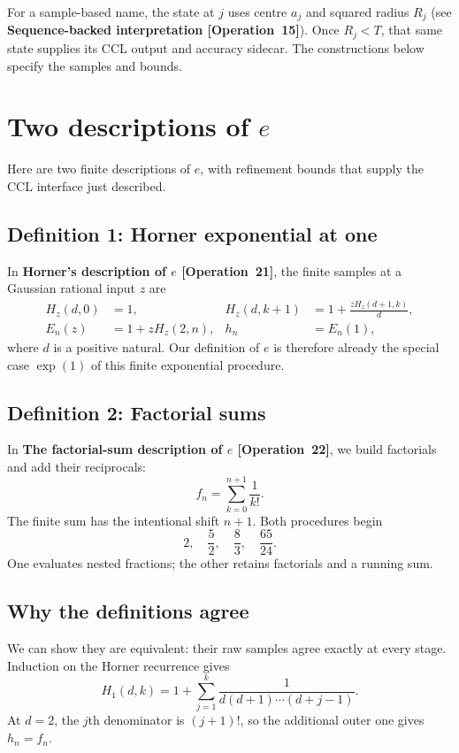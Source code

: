 \documentclass[11pt]{article}
\newcommand{\entryname}[3]{\textbf{#3 \mbox{[#1~#2]}}}
\begin{document}
For a sample-based name, the state at $j$ uses centre $a_j$ and squared
radius $R_j$ (see \entryname{Operation}{15}{Sequence-backed interpretation}).
Once $R_j<T$, that same state supplies its CCL output and
accuracy sidecar. The constructions below specify the samples and bounds.

\section{Two descriptions of \texorpdfstring{$e$}{e}}\label{sec:e}

Here are two finite descriptions of $e$, with refinement bounds
that supply the CCL interface just described.

\subsection*{Definition 1: Horner exponential at one}

In \entryname{Operation}{21}{Horner's description of $e$}, the finite samples at a
Gaussian rational input $z$ are
\begin{align*}
 H_z(d,0)&=1, & H_z(d,k+1)&=1+\frac{zH_z(d+1,k)}d,\\
 E_n(z)&=1+zH_z(2,n), & h_n&=E_n(1),
\end{align*}
where $d$ is a positive natural. Our definition of $e$ is therefore already
the special case $\exp(1)$ of this finite exponential procedure.

\subsection*{Definition 2: Factorial sums}

In \entryname{Operation}{22}{The factorial-sum description of $e$}, we build factorials
and add their reciprocals:
\[
                  f_n=\sum_{k=0}^{n+1}\frac1{k!}.
\]
The finite sum has the intentional shift $n+1$. Both procedures begin
\[
                      2,\quad\frac52,\quad\frac83,\quad\frac{65}{24}.
\]
One evaluates nested fractions; the other retains factorials and a running sum.

\subsection*{Why the definitions agree}

We can show they are equivalent: their raw samples agree exactly at every
stage. Induction on the Horner recurrence gives
\[
 H_1(d,k)=1+\sum_{j=1}^{k}\frac1{d(d+1)\cdots(d+j-1)}.
\]
At $d=2$, the $j$th denominator is $(j+1)!$, so the additional outer one
gives $h_n=f_n$.
\end{document}
